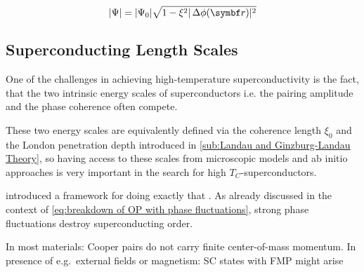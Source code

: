 \documentclass[../notes.tex]{subfiles}
\begin{document}



\begin{equation}
	\vert \Psi \vert = \vert \Psi_0 \vert \sqrt{1 - \xi^2 \vert \adif{\phi} (\vb{r}) \vert^2}
	\label{eq:breakdown of OP with phase fluctuations}
\end{equation}



\subsection{Superconducting Length Scales}

One of the challenges in achieving high-temperature superconductivity is the fact, that the two intrinsic energy scales of superconductors i.e. the pairing amplitude and the phase coherence often compete.

\cite{hazraBoundsSuperconductingTransition2019}

These two energy scales are equivalently defined via the coherence length \(\xi_0\) and the London penetration depth introduced in \cref{sub:Landau and Ginzburg-Landau Theory}, so having access to these scales from microscopic models and ab initio approaches is very important in the search for high \(T_C\)-superconductors.

\citeauthor{wittBypassingLatticeBCS2024} introduced a framework for doing exactly that \cite{wittBypassingLatticeBCS2024}.
As already discussed in the context of \cref{eq:breakdown of OP with phase fluctuations}, strong phase fluctuations destroy superconducting order.



In most materials: Cooper pairs do not carry finite center-of-mass momentum.
In presence of e.g.\ external fields or magnetism: SC states with FMP might arise \cite{chenFiniteMomentumCooper2018, wanOrbitalFuldeFerrell2023, yuanSupercurrentDiodeEffect2022}
\end{document}
